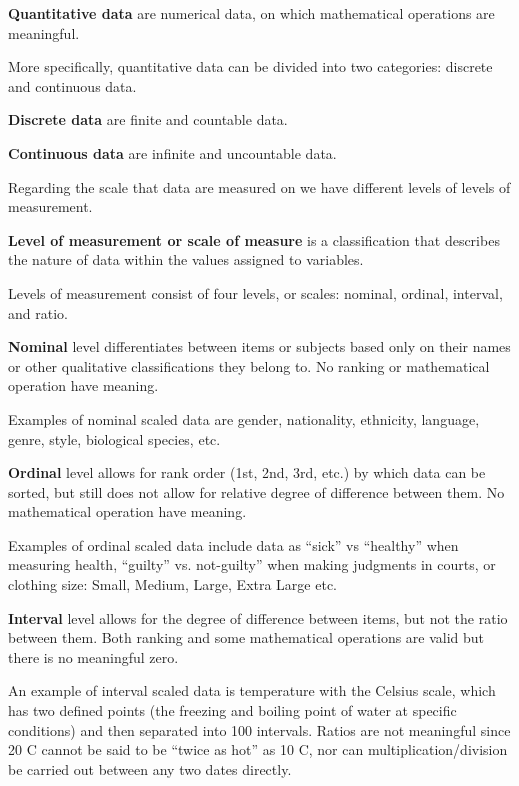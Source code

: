 \textbf{Quantitative data} are numerical data, on which mathematical operations are meaningful.
\ed

More specifically, quantitative data can be divided into two categories: discrete and continuous data.

\textbf{Discrete data} are finite and countable data.
\ed

\textbf{Continuous data} are infinite and uncountable data.
\ed

Regarding the scale that data are measured on we have different levels of levels of measurement.

\textbf{Level of measurement or scale of measure} is a classification that describes the nature of data within the
values assigned to variables.
\ed

Levels of measurement consist of four levels, or scales: nominal, ordinal, interval, and ratio.

\bd[Nominal]
\textbf{Nominal} level differentiates between items or subjects based only on their names or other qualitative
classifications they belong to. No ranking or mathematical operation have meaning.
\ed

Examples of nominal scaled data are gender, nationality, ethnicity, language, genre, style, biological species, etc.

\bd[Ordinal]
\textbf{Ordinal} level allows for rank order (1st, 2nd, 3rd, etc.) by which data can be sorted, but still does not
allow for relative degree of difference between them. No mathematical operation have meaning.
\ed

Examples of ordinal scaled data include data as ``sick'' vs ``healthy'' when measuring health, ``guilty'' vs.
not-guilty'' when making judgments in courts, or clothing size: Small, Medium, Large, Extra Large etc.

\bd[Interval]
\textbf{Interval} level allows for the degree of difference between items, but not the ratio between them. Both
ranking and some mathematical operations are valid but there is no meaningful zero.
\ed

An example of interval scaled data is temperature with the Celsius scale, which has two defined points (the freezing
and boiling point of water at specific conditions) and then separated into 100 intervals. Ratios are not meaningful
since 20 \textdegree{}C cannot be said to be ``twice as hot'' as 10 \textdegree{}C, nor can multiplication/division be
carried out between any two dates directly.

